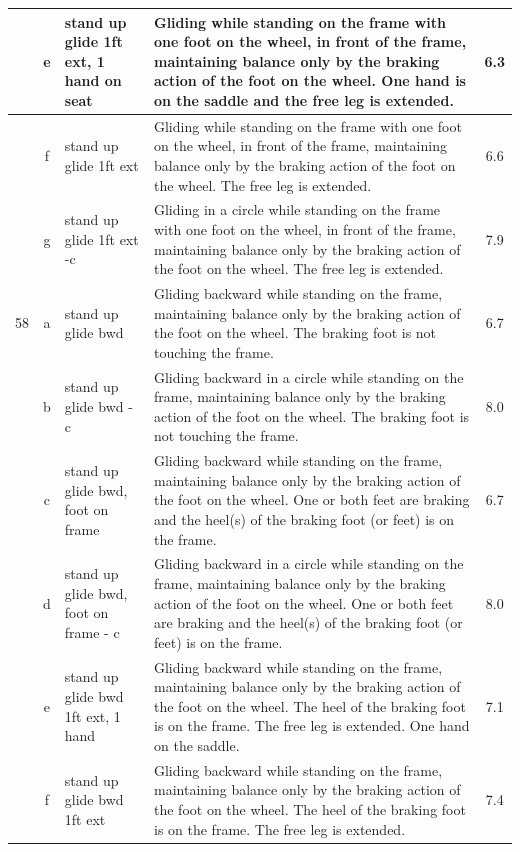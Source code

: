 \begin{longtable}{|r|c|p{4cm}|p{8cm}|c|}
\hline
  & e & stand up glide 1ft ext, 1 hand on seat  & Gliding while standing on the frame with one foot on the wheel, in front of the frame, maintaining balance only by the braking action of the foot on the wheel. One hand is on the saddle and the free leg is extended. & 6.3 \\ 
\hline
  & f & stand up glide 1ft ext  & Gliding while standing on the frame with one foot on the wheel, in front of the frame, maintaining balance only by the braking action of the foot on the wheel. The free leg is extended. & 6.6 \\ 
\hline
  & g & stand up glide 1ft ext -c & Gliding in a circle while standing on the frame with one foot on the wheel, in front of the frame, maintaining balance only by the braking action of the foot on the wheel. The free leg is extended. & 7.9 \\ 
\hline
58  & a & stand up glide bwd  & Gliding backward while standing on the frame, maintaining balance only by the braking action of the foot on the wheel. The braking foot is not touching the frame.  & 6.7 \\ 
\hline
  & b & stand up glide bwd - c  & Gliding backward in a circle while standing on the frame, maintaining balance only by the braking action of the foot on the wheel. The braking foot is not touching the frame.  & 8.0 \\ 
\hline
  & c & stand up glide bwd, foot on frame & Gliding backward while standing on the frame, maintaining balance only by the braking action of the foot on the wheel. One or both feet are braking and the heel(s) of the braking foot (or feet) is on the frame.  & 6.7 \\ 
\hline
  & d & stand up glide bwd, foot on frame - c & Gliding backward in a circle while standing on the frame, maintaining balance only by the braking action of the foot on the wheel. One or both feet are braking and the heel(s) of the braking foot (or feet) is on the frame.  & 8.0 \\ 
\hline
  & e & stand up glide bwd 1ft ext, 1 hand  & Gliding backward while standing on the frame, maintaining balance only by the braking action of the foot on the wheel. The heel of the braking foot is on the frame. The free leg is extended. One hand on the saddle.  & 7.1 \\ 
\hline
  & f & stand up glide bwd 1ft ext  & Gliding backward while standing on the frame, maintaining balance only by the braking action of the foot on the wheel. The heel of the braking foot is on the frame. The free leg is extended.  & 7.4 \\ 

\end{longtable}
